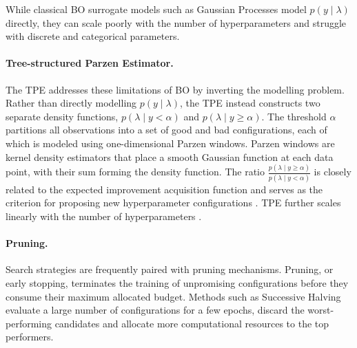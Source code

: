 While classical BO surrogate models such as Gaussian Processes model $p(y \mid \lambda)$ directly, they can scale poorly with the number of hyperparameters and struggle with discrete and categorical parameters.

\paragraph{Tree-structured Parzen Estimator.} 
The \ac{TPE} \parencite{bergstra2011algorithms} addresses these limitations of \ac{BO} by inverting the modelling problem. Rather than directly modelling $p(y \mid \lambda)$, the \ac{TPE} instead constructs two separate density functions, $p(\lambda \mid y < \alpha)$ and $p(\lambda \mid y \geq \alpha)$. The threshold $\alpha$ partitions all observations into a set of good and bad configurations, each of which is modeled using one-dimensional Parzen windows. 
Parzen windows are kernel density estimators that place a smooth Gaussian function at each data point, with their sum forming the density function.
 The ratio $\frac{p(\lambda\mid y \ge \alpha)}{p(\lambda\mid y < \alpha)}$ is closely related to the expected improvement acquisition function and serves as the criterion for proposing new hyperparameter configurations \parencite{bergstra2011algorithms, hutter2019automated}. \ac{TPE} further scales linearly with the number of hyperparameters \parencite{AutoMLHoos}. %



\paragraph{Pruning.}%
Search strategies are frequently paired with pruning mechanisms. Pruning, or early stopping, terminates the training of unpromising configurations before they consume their maximum allocated budget. Methods such as Successive Halving evaluate a large number of configurations for a few epochs, discard the worst-performing candidates and allocate more computational resources to the top performers.


